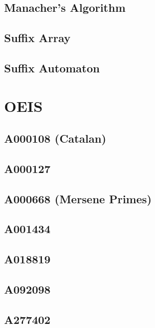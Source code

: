 \subsection{Manacher's Algorithm}

\subsection{Suffix Array}

\subsection{Suffix Automaton}

\section{OEIS}
\subsection{A000108 (Catalan)}

\subsection{A000127}

\subsection{A000668 (Mersene Primes)}

\subsection{A001434}

\subsection{A018819}

\subsection{A092098}

\subsection{A277402}

